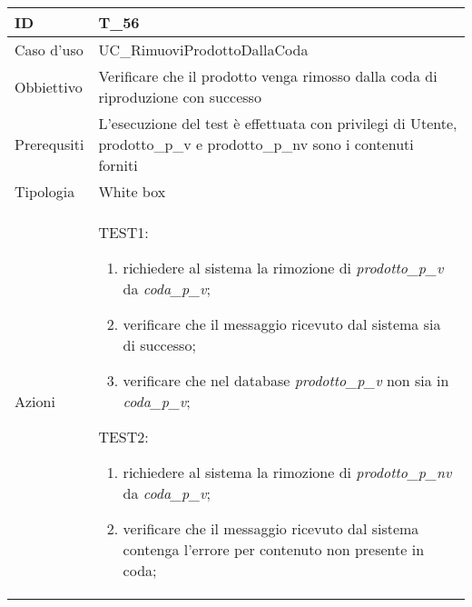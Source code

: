 \begin{table}[hb]
    \centering
    \begin{tabular}{ |p{2cm}|p{10cm}|  }
        \hline
        ID          & T\_56                                                                 \\\hline
        Caso d'uso  & UC\_RimuoviProdottoDallaCoda                                                    \\\hline
        Obbiettivo  & Verificare che il prodotto venga rimosso dalla coda di riproduzione con successo \\\hline
        Prerequsiti & L'esecuzione del test è effettuata con privilegi di Utente, prodotto\_p\_v
        e prodotto\_p\_nv sono i contenuti forniti           \\\hline
        Tipologia   & White box                                                             \\\hline
        Azioni      &
        TEST1:
        \begin{enumerate}[nosep, topsep=0pt]
            \item richiedere al sistema la rimozione di \emph{prodotto\_p\_v} da \emph{coda\_p\_v};
            \item verificare che il messaggio ricevuto dal sistema sia di successo;
            \item verificare che nel database \emph{prodotto\_p\_v} non sia in \emph{coda\_p\_v};
        \end{enumerate}
        \vspace{0.5cm} TEST2:
        \begin{enumerate}[nosep, topsep=0pt]
            \item richiedere al sistema la rimozione di \emph{prodotto\_p\_nv} da \emph{coda\_p\_v};
            \item verificare che il messaggio ricevuto dal sistema contenga l'errore per
            contenuto non presente in coda;
        \end{enumerate}
        \\\hline
    \end{tabular}
\end{table}

